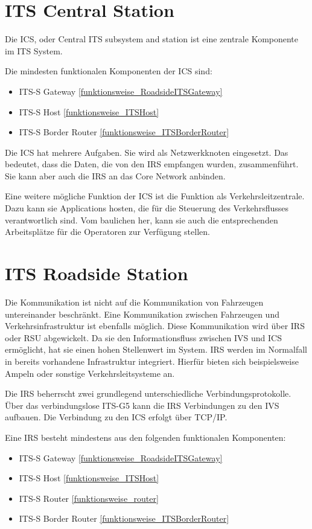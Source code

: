\section{ITS Central Station}
Die \ac{ICS}, oder Central \ac{ITS} subsystem and station ist eine zentrale Komponente im \ac{ITS} System.

Die mindesten funktionalen Komponenten der \ac{ICS} sind:
\begin{itemize}
	\item \ac{ITS-S} Gateway \ref{funktionsweise_RoadsideITSGateway}
	\item \ac{ITS-S} Host \ref{funktionsweise_ITSHost}
	\item \ac{ITS-S} Border Router \ref{funktionsweise_ITSBorderRouter}
\end{itemize}

Die \ac{ICS} hat mehrere Aufgaben. Sie wird als Netzwerkknoten eingesetzt. Das bedeutet, dass die Daten, die von den \ac{IRS} empfangen wurden, zusammenführt. Sie kann aber auch die \ac{IRS} an das Core Network anbinden.

Eine weitere mögliche Funktion der \ac{ICS} ist die Funktion als Verkehrsleitzentrale. Dazu kann sie Applications hosten, die für die Steuerung des Verkehrsflusses verantwortlich sind. Vom baulichen her, kann sie auch die entsprechenden Arbeitsplätze für die Operatoren zur Verfügung stellen. 
	
	
\section{ITS Roadside Station}
Die Kommunikation ist nicht auf die Kommunikation von Fahrzeugen untereinander beschränkt. Eine Kommunikation zwischen Fahrzeugen und Verkehrsinfrastruktur ist ebenfalls möglich. Diese Kommunikation wird über \ac{IRS} oder \ac{RSU} abgewickelt. Da sie den Informationsfluss zwischen \ac{IVS} und \ac{ICS} ermöglicht, hat sie einen hohen Stellenwert im System. \ac{IRS} werden im Normalfall in bereits vorhandene Infrastruktur integriert. Hierfür bieten sich beispielsweise Ampeln oder sonstige Verkehrsleitsysteme an. 

Die \ac{IRS} beherrscht zwei grundlegend unterschiedliche Verbindungsprotokolle. Über das verbindungslose ITS-G5 kann die \ac{IRS} Verbindungen zu den \ac{IVS} aufbauen. Die Verbindung zu den \ac{ICS} erfolgt über TCP/IP. 

Eine \ac{IRS} besteht mindestens aus den folgenden funktionalen Komponenten:

\begin{itemize}
	\item  \ac{ITS-S} Gateway \ref{funktionsweise_RoadsideITSGateway}
	\item \ac{ITS-S} Host \ref{funktionsweise_ITSHost}
	\item \ac{ITS-S} Router \ref{funktionsweise_router}
	\item \ac{ITS-S} Border Router \ref{funktionsweise_ITSBorderRouter}
\end{itemize}

